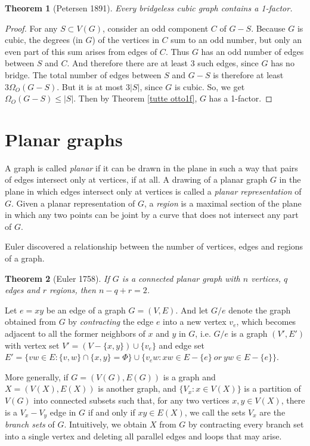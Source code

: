 \documentclass[12pt]{report}
\newtheorem{theorem}{Theorem}
\begin{document}
\begin{theorem}[Petersen 1891]\label{petbrile1fa}
Every bridgeless cubic graph contains a 1-factor.
\end{theorem}
\begin{proof}
For any $S\subset V(G)$, consider an odd component $C$ of $G-S$. Because $G$ is cubic, the degrees (in $G$) of the vertices in $C$ sum to an odd number, but only an even part of this sum arises from edges of $C$. Thus $G$ has an odd number of edges between $S$ and $C$. And therefore there are at least 3 such edges, since $G$ has no bridge. The total number of edges between $S$ and $G-S$ is therefore at least $3\Omega_O(G-S)$. But it is at most $3|S|$, since $G$ is cubic. So, we get $\Omega_O(G-S)\le|S|$. Then by Theorem \ref{tutte otto1f}, $G$ has a 1-factor.
\end{proof}


\section{Planar graphs}\label{secnoplg}
A graph is called {\em planar} if it can be drawn in the plane in such a way that pairs of edges intersect only at vertices, if at all. A drawing of a planar graph $G$ in the plane in which edges intersect only at vertices is called a {\em planar representation} of $G$.
Given a planar representation of $G$, a {\em region} is a maximal section of the plane in which any two points can be joint by a curve that does not intersect any part of $G$.

Euler discovered a relationship between the number of vertices, edges and regions of a graph.
\begin{theorem}[Euler 1758]
If  $G$ is a connected planar graph with $n$ vertices, $q$ edges and $r$ regions, then $n-q+r=2$.
\end{theorem}

Let $e=xy$ be an edge of a graph $G=(V,E)$. And let $G/e$ denote the graph obtained from $G$ by {\em contracting} the edge $e$ into a new vertex $v_e$, which becomes adjacent to all the former neighbors of $x$ and $y$ in $G$, i.e. $G/e$ is a graph $(V',E')$ with vertex set $V'=(V-\{x,y\})\cup\{v_e\}$ and edge set $E'=\{vw\in E:\{v,w\}\cap\{x,y\}=\Phi\}\cup\{v_ew:xw\in E-\{e\}~or~yw\in E-\{e\}\}$.

More generally, if $G=(V(G),E(G))$ is a graph and $X=(V(X),E(X))$ is another graph, and $\{V_x:x\in V(X)\}$ is a partition of $V(G)$ into connected subsets such that, for any two vertices $x,y\in V(X)$, there is a $V_x-V_y$ edge in $G$ if and only if $xy\in E(X)$, we call the sets $V_x$ are the {\em branch sets} of $G$. Intuitively, we obtain $X$ from $G$ by contracting every branch set into a single vertex and deleting all parallel edges and loops that may arise. 
\end{document}
